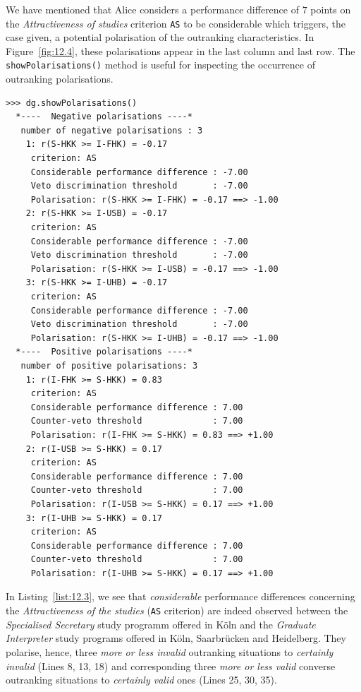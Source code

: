 We have mentioned that Alice considers a performance difference of $7$ points on the \emph{Attractiveness of studies} criterion \texttt{AS} to be considerable which triggers, the case given, a potential polarisation of the outranking characteristics. In Figure~\vref{fig:12.4}, these polarisations appear in the last column and last row. The \texttt{showPolarisations()} method  is useful for inspecting the occurrence of outranking polarisations.
\begin{lstlisting}[caption={Inspecting polarised outranking situations},label=list:12.3]
>>> dg.showPolarisations()
  *----  Negative polarisations ----*
   number of negative polarisations : 3 
    1: r(S-HKK >= I-FHK) = -0.17
     criterion: AS
     Considerable performance difference : -7.00
     Veto discrimination threshold       : -7.00
     Polarisation: r(S-HKK >= I-FHK) = -0.17 ==> -1.00
    2: r(S-HKK >= I-USB) = -0.17
     criterion: AS
     Considerable performance difference : -7.00
     Veto discrimination threshold       : -7.00
     Polarisation: r(S-HKK >= I-USB) = -0.17 ==> -1.00
    3: r(S-HKK >= I-UHB) = -0.17
     criterion: AS
     Considerable performance difference : -7.00
     Veto discrimination threshold       : -7.00
     Polarisation: r(S-HKK >= I-UHB) = -0.17 ==> -1.00
  *----  Positive polarisations ----*
   number of positive polarisations: 3 
    1: r(I-FHK >= S-HKK) = 0.83
     criterion: AS
     Considerable performance difference : 7.00
     Counter-veto threshold              : 7.00
     Polarisation: r(I-FHK >= S-HKK) = 0.83 ==> +1.00
    2: r(I-USB >= S-HKK) = 0.17
     criterion: AS
     Considerable performance difference : 7.00
     Counter-veto threshold              : 7.00
     Polarisation: r(I-USB >= S-HKK) = 0.17 ==> +1.00
    3: r(I-UHB >= S-HKK) = 0.17
     criterion: AS
     Considerable performance difference : 7.00
     Counter-veto threshold              : 7.00
     Polarisation: r(I-UHB >= S-HKK) = 0.17 ==> +1.00
\end{lstlisting}

In Listing~\vref{list:12.3}, we see that \emph{considerable} performance differences concerning the \emph{Attractiveness of the studies} (\texttt{AS} criterion) are indeed observed between the \emph{Specialised Secretary} study programm offered in Köln and the \emph{Graduate Interpreter} study programs offered in Köln, Saarbrücken and Heidelberg. They polarise, hence, three \emph{more or less invalid} outranking situations to \emph{certainly invalid} (Lines 8, 13, 18) and corresponding three \emph{more or less valid} converse outranking situations to \emph{certainly valid} ones (Lines 25, 30, 35). 

